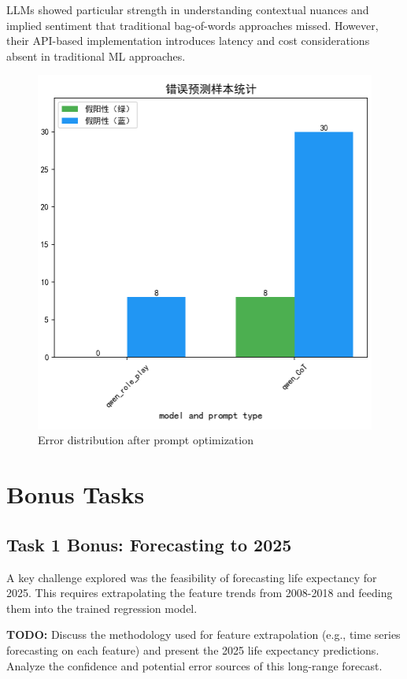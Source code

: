 \documentclass{article}
\begin{document}
LLMs showed particular strength in understanding contextual nuances and implied sentiment that traditional bag-of-words approaches missed. However, their API-based implementation introduces latency and cost considerations absent in traditional ML approaches.

\begin{figure}[h]
    \centering
    \includegraphics[width=1\columnwidth]{pic/T2P2B2.2.png}
    \caption{Error distribution after prompt optimization}
    \label{fig:error_analysis}
\end{figure}

\section{Bonus Tasks}
\label{sec:bonus}

\subsection{Task 1 Bonus: Forecasting to 2025}
A key challenge explored was the feasibility of forecasting life expectancy for 2025. This requires extrapolating the feature trends from 2008-2018 and feeding them into the trained regression model.

\textbf{TODO:} Discuss the methodology used for feature extrapolation (e.g., time series forecasting on each feature) and present the 2025 life expectancy predictions. Analyze the confidence and potential error sources of this long-range forecast.
\end{document}
